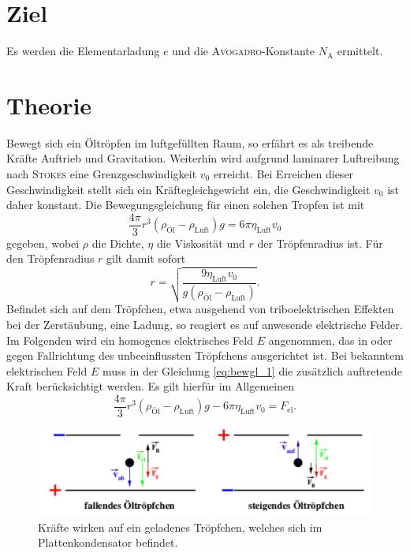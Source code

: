 \section*{Ziel}

Es werden die Elementarladung $e$  und die \textsc{Avogadro}-Konstante $N_\text{A}$ ermittelt.
\section{Theorie}
\label{sec:Theorie}

Bewegt sich ein Öltröpfen im luftgefüllten Raum, so erfährt es als treibende Kräfte Auftrieb und Gravitation.
Weiterhin wird aufgrund laminarer Luftreibung nach \textsc{Stokes} eine Grenzgeschwindigkeit $v_0$ erreicht.
Bei Erreichen dieser Geschwindigkeit stellt sich ein Kräftegleichgewicht ein,
die Geschwindigkeit $v_0$ ist daher konstant.
Die Bewegungsgleichung für einen solchen Tropfen ist mit
\begin{equation}
	\frac{4\pi}{3}r^3(\rho_\text{Öl}-\rho_\text{Luft})g=6\pi\eta_\text{Luft}v_0
	\label{eq:bewgl_1}
\end{equation}
gegeben, wobei $\rho$ die Dichte, $\eta$ die Viskosität und $r$ der Tröpfenradius ist.
Für den Tröpfenradius $r$ gilt damit sofort
\begin{equation}
	r=\sqrt{\frac{9\eta_\text{Luft}v_0}{g(\rho_\text{Öl}-\rho_\text{Luft})}}.
	\label{eq:radius_v0}
\end{equation}
Befindet sich auf dem Tröpfchen, etwa ausgehend von triboelektrischen Effekten bei der Zerstäubung,
eine Ladung, so reagiert es auf anwesende elektrische Felder.
Im Folgenden wird ein homogenes elektrisches Feld $E$ angenommen, das in oder gegen Fallrichtung des unbeeinflussten Tröpfchens ausgerichtet ist. %
Bei bekanntem elektrischen Feld $E$ muss in der Gleichung \ref{eq:bewgl_1} die zusätzlich auftretende Kraft berücksichtigt werden.
Es gilt hierfür im Allgemeinen
\begin{equation}
	\frac{4\pi}{3}r^3(\rho_\text{Öl}-\rho_\text{Luft})g-6\pi\eta_\text{Luft}v_0= F_\text{el}.
	\label{eq:bewgl_2a}
\end{equation}

\begin{figure}
	\centering
	\includegraphics[width=\textwidth]{Bilder/Tropfen.pdf}
	\caption{Kräfte wirken auf ein geladenes Tröpfchen, welches sich im Plattenkondensator befindet.\cite{skript}}
	\label{fig:tropfen}
\end{figure}

